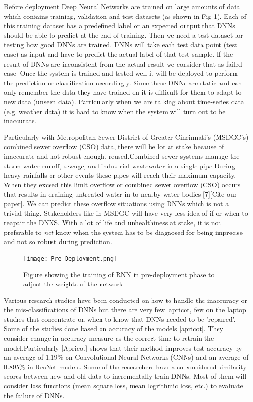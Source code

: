 \documentclass[sigconf,authordraft]{acmart}
\begin{document}
 Before deployment Deep Neural Networks are trained on large amounts of data which contains training, validation and test datasets (as shown in Fig 1). Each of this training dataset has a predefined label or an expected output that DNNs should be able to predict at the end of training. Then we need a test dataset for testing how good DNNs are trained. DNNs will take each test data point (test case) as input and have to predict the actual label of that test sample. If the result of DNNs are inconsistent from the actual result we consider that as failed case. Once the system is trained and tested well it will be deployed to perform the prediction or classification accordingly. Since these DNNs are static and can only remember the data they have trained on it is difficult for them to adapt to new data (unseen data). Particularly when we are talking about time-series data (e.g. weather data) it is hard to know when the system will turn out to be inaccurate. 
 
Particularly with Metropolitan Sewer District of Greater Cincinnati's (MSDGC's) combined sewer overflow (CSO) data, there will be lot at stake because of inaccurate and not robust enough. reused.Combined sewer systems manage the storm water runoff, sewage, and industrial wastewater in a single pipe.During heavy rainfalls or other events these pipes will reach their maximum capacity. When they exceed this limit overflow or combined sewer overflow (CSO) occurs that results in draining untreated water in to nearby water bodies [7][Cite our paper]. We can predict these overflow situations using DNNs which is not a trivial thing. Stakeholders like in MSDGC will have very less idea of if or when to reapair the DNNS. With a lot of life and unhealthiness at stake, it is not preferable to \emph{not} know when the system has to be diagnosed for being imprecise and not so robust during prediction.

\begin{figure}
\texttt{[image: Pre-Deployment.png]}
\caption{Figure showing the training of RNN in pre-deployment phase to adjust the weights of the network } \label{fig:1}
\end{figure}

 
Various research studies have been conducted on how to handle the inaccuracy or the mis-classifications of DNNs but there are very few [apricot, few on the laptop] studies that concentrate on when to know that DNNs needed to be 'repaired'. Some of the studies done based on accuracy of the models [apricot]. They consider change in accuracy measure as the correct time to retrain the model.Particularly [Apricot] shows that their method improves test accuracy by an average of 1.19\%  on Convolutional Neural Networks (CNNs) and an average of 0.895\% in ResNet models. Some of the researchers have also considered similarity scores between new and old data to incrementally train DNNs. Most of them will consider loss functions (mean square loss, mean logrithmic loss, etc.) to evaluate the failure of DNNs.  %
\end{document}
